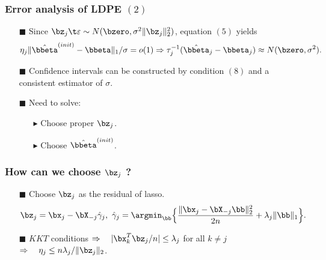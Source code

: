 \begin{frame}
\frametitle{Error analysis of LDPE $(2)$}
\begin{itemize}

\item[$\blacksquare$] Since $\bz_{j} \t \varepsilon \sim N(\bzero, \sigma^{2} \|\bz_{j}\|^{2}_{2})$, equation $(5)$ yields
\begin{equation}
\eta_{j}\|\hat{\bbeta}^{(init)}-\bbeta\|_{1}/\sigma=o(1)\Rightarrow \tau^{-1}_{j}(\hat{\bbeta}_{j}-\bbeta_{j})\approx N(\bzero,\sigma^{2}).
\end{equation}
\item[$\blacksquare$] Confidence intervals can be constructed by condition $(8)$ and a consistent estimator of $\sigma$.
\item[$\blacksquare$] Need to solve:
  \begin{itemize}
  \item[$\blacktriangleright$] Choose proper $\bz_{j}$.
  \item[$\blacktriangleright$] Choose $\hat{\bbeta}^{(init)}$.
  \end{itemize}

\end{itemize}
\end{frame}

\begin{frame}
\frametitle{How can we choose $\bz_{j}$ ?}
\begin{itemize}

\item[$\blacksquare$] Choose $\bz_{j}$ as the residual of lasso.
\begin{equation}
\bz_j = \bx_j - \bX_{-j} \hat{\gamma}_j,\
\hat{\gamma}_j = \argmin_{\bb}\Big\{\frac{\|\bx_j-\bX_{-j}\bb\|_2^2}{2n}+\lambda_j \|\bb\|_1\Big\}.
\end{equation}
\item[$\blacksquare$] $KKT$ conditions \quad  $\Rightarrow \quad |\bx_k^T\bz_j/n|\le\lambda_{j}$ for all $k \neq j$
                      $\Rightarrow \quad \eta_j\le n\lambda_j/\|\bz_j\|_2$.

\end{itemize}


\end{frame}


